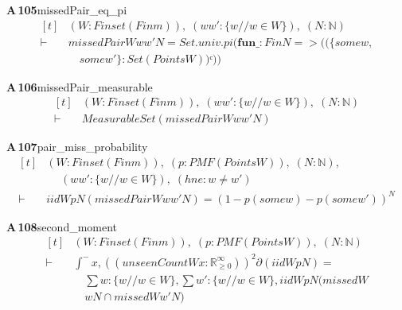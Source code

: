 \documentclass[conference]{IEEEtran}
\theoremstyle{definition}
\newcommand{\lean}[1]{\textsf{\footnotesize #1}}
\begin{document}
\noindent\textbf{A\,105}\quad\lean{missedPair\_eq\_pi}
{\footnotesize\[ \begin{aligned}[t]
&(\mathit{W} : \mathit{Finset} (\mathit{Fin} \mathit{m})),\; (\mathit{w} \mathit{w'} : \{ \mathit{w} // \mathit{w} \in \mathit{W}\} ),\; (\mathit{N} : \mathbb{N} )\\
\vdash\;&\mathit{missedPair} \mathit{W} \mathit{w} \mathit{w'} \mathit{N} = \mathit{Set}.\mathit{univ}.\mathit{pi} (\mathbf{fun} \mathit{\_} : \mathit{Fin} \mathit{N} => ((\{ \mathit{some} \mathit{w},\\
&\quad \mathit{some} \mathit{w'}\} : \mathit{Set} (\mathit{Points} \mathit{W}))ᶜ))
\end{aligned} \]}

\noindent\textbf{A\,106}\quad\lean{missedPair\_measurable}
{\footnotesize\[ \begin{aligned}[t]
&(\mathit{W} : \mathit{Finset} (\mathit{Fin} \mathit{m})),\; (\mathit{w} \mathit{w'} : \{ \mathit{w} // \mathit{w} \in \mathit{W}\} ),\; (\mathit{N} : \mathbb{N} )\\
\vdash\;&\mathit{MeasurableSet} (\mathit{missedPair} \mathit{W} \mathit{w} \mathit{w'} \mathit{N})
\end{aligned} \]}

\noindent\textbf{A\,107}\quad\lean{pair\_miss\_probability}
{\footnotesize\[ \begin{aligned}[t]
&(\mathit{W} : \mathit{Finset} (\mathit{Fin} \mathit{m})),\; (\mathit{p} : \mathit{PMF} (\mathit{Points} \mathit{W})),\; (\mathit{N} : \mathbb{N} ),\\
&\quad \; (\mathit{w} \mathit{w'} : \{ \mathit{w} // \mathit{w} \in \mathit{W}\} ),\; (\mathit{hne} : \mathit{w} \neq \mathit{w'})\\
\vdash\;&\mathit{iid} \mathit{W} \mathit{p} \mathit{N} (\mathit{missedPair} \mathit{W} \mathit{w} \mathit{w'} \mathit{N}) = (1 - \mathit{p} (\mathit{some} \mathit{w}) - \mathit{p} (\mathit{some} \mathit{w'}))^{\mathit{N}}
\end{aligned} \]}

\noindent\textbf{A\,108}\quad\lean{second\_moment}
{\footnotesize\[ \begin{aligned}[t]
&(\mathit{W} : \mathit{Finset} (\mathit{Fin} \mathit{m})),\; (\mathit{p} : \mathit{PMF} (\mathit{Points} \mathit{W})),\; (\mathit{N} : \mathbb{N} )\\
\vdash\;&\int^{-} \mathit{x}, ((\mathit{unseenCount} \mathit{W} \mathit{x} : \mathbb{R}_{\geq0}^{\infty} ))^{2} ∂(\mathit{iid} \mathit{W} \mathit{p} \mathit{N}) =\\
&\quad \textstyle\sum \mathit{w} : \{ \mathit{w} // \mathit{w} \in \mathit{W}\} , \textstyle\sum \mathit{w'} : \{ \mathit{w} // \mathit{w} \in \mathit{W}\} , \mathit{iid} \mathit{W} \mathit{p} \mathit{N} (\mathit{missed} \mathit{W}\\
&\quad \mathit{w} \mathit{N} \cap \mathit{missed} \mathit{W} \mathit{w'} \mathit{N})
\end{aligned} \]}
\end{document}
